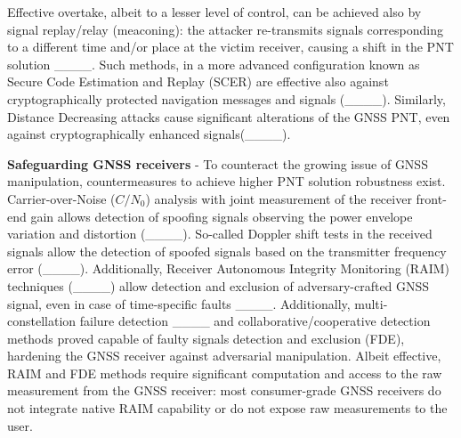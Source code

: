 Effective overtake, albeit to a lesser level of control, can be achieved also by signal replay/relay (meaconing): the attacker re-transmits signals corresponding to a different time and/or place at the victim receiver, causing a shift in the PNT solution ____. Such methods, in a more advanced configuration known as Secure Code Estimation and Replay (SCER) are effective also against cryptographically protected navigation messages and signals (____). Similarly, Distance Decreasing attacks cause significant alterations of the GNSS PNT, even against cryptographically enhanced signals(____).


\textbf{Safeguarding GNSS receivers} - To counteract the growing issue of GNSS manipulation, countermeasures to achieve higher PNT solution robustness exist. Carrier-over-Noise ($C/N_0$) analysis with joint measurement of the receiver front-end gain allows detection of spoofing signals observing the power envelope variation and distortion (____). So-called Doppler shift tests in the received signals allow the detection of spoofed signals based on the transmitter frequency error (____). Additionally, Receiver Autonomous Integrity Monitoring (RAIM) techniques (____) allow detection and exclusion of adversary-crafted GNSS signal, even in case of time-specific faults ____. Additionally, multi-constellation failure detection ____ and collaborative/cooperative detection methods proved capable of faulty signals detection and exclusion (FDE), hardening the GNSS receiver against adversarial manipulation. Albeit effective, RAIM and FDE methods require significant computation and access to the raw measurement from the GNSS receiver: most consumer-grade GNSS receivers do not integrate native RAIM capability or do not expose raw measurements to the user.


